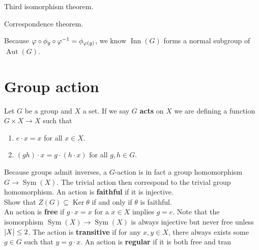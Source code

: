 \documentclass{report}
\begin{document}
Third isomorphism theorem. 

Correspondence theorem.


Because $ \phi\circ \pfi _g \circ \phi^{-1} = \pfi _{\phi(g)}$, we know $\operatorname{Inn}(G)$ forms a normal subgroup of $\operatorname{Aut}(G)$. \\
\section{Group action}
Let $G$ be a group and $X$ a set. If we say  $G$ \textbf{acts} on $X$ we are defining a function $G \times X\rightarrow X$ such that 
\begin{enumerate}[label=(\roman*)]
  \item $e\cdot x=x$ for all $x\in X$. 
  \item $(gh)\cdot x= g \cdot (h \cdot x)$ for all $g,h \in G$. 
\end{enumerate}
Because groups admit inverses, a $G$-action is in fact a group homomorphism $G \rightarrow \operatorname{Sym}(X)$. The trivial action then correspond to the trivial group homomorphism.  An action is \textbf{faithful} if it is injective. \\


Show that $Z(G)\subseteq \operatorname{Ker} \theta$ if and only if $\theta$ is faithful.  \\


An action is \textbf{free} if $g\cdot x=x$ for a $x\in X$ implies $g=e$. Note that the isomorphism $\operatorname{Sym}(X)\rightarrow \operatorname{Sym}(X)$ is always injective but never free unless $\left|X\right|\leq 2$. The action is \textbf{transitive} if for any $x,y \in X$, there always exists some $g \in G$ such that $y= g \cdot x$. An action is \textbf{regular} if it is both free and tran
\end{document}
